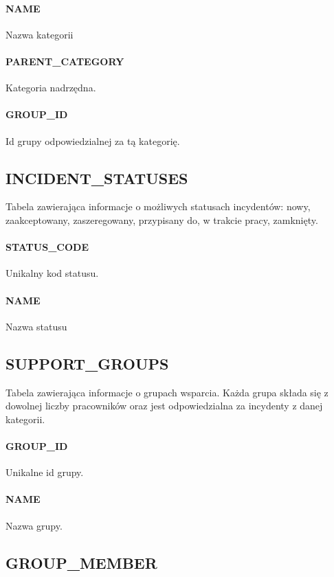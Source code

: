 \documentclass[a4paper, oneside, 11pt]{report}
\begin{document}
\paragraph{NAME} Nazwa kategorii
\paragraph{PARENT\_CATEGORY} Kategoria nadrzędna.
\paragraph{GROUP\_ID} Id grupy odpowiedzialnej za tą kategorię.

\subsection{INCIDENT\_STATUSES}

Tabela zawierająca informacje o możliwych statusach incydentów: nowy, zaakceptowany, zaszeregowany, przypisany do, w trakcie pracy, zamknięty.

\paragraph{STATUS\_CODE} Unikalny kod statusu.
\paragraph{NAME} Nazwa statusu

\subsection{SUPPORT\_GROUPS}

Tabela zawierająca informacje o grupach wsparcia. Każda grupa składa się z dowolnej liczby pracowników oraz jest odpowiedzialna za incydenty z danej kategorii.

\paragraph{GROUP\_ID} Unikalne id grupy.
\paragraph{NAME} Nazwa grupy.

\subsection{GROUP\_MEMBER}
\end{document}
